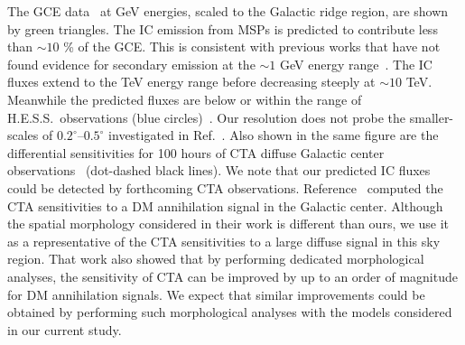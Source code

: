 \documentclass[doublespace,nopageskip]{VTthesis} %
\begin{document}
The GCE data~\cite{2015MNRAS.451.1833M} at GeV energies, scaled to the Galactic ridge region, are shown by green triangles. The IC emission from MSPs is predicted to contribute less than $\sim 10$ \% of the GCE. This is consistent with previous works that have not found evidence for secondary emission at the $\sim 1$ GeV energy range~\cite{2016PhRvD..93j3004L}. The IC fluxes extend to the TeV energy range before decreasing steeply at $\sim 10$ TeV. Meanwhile the predicted fluxes are below or within the range of H.E.S.S.~observations (blue circles)~\cite{2006Natur.439..695A}. Our resolution does not probe the smaller-scales of $0.2^\circ$--$0.5^\circ$ investigated in Ref.~\cite{2018PhRvD..98d3005H}. Also shown in the same figure are the differential sensitivities for 100 hours of CTA diffuse Galactic center observations~\cite{2015JCAP...03..055S} (dot-dashed black lines). We note that our predicted IC fluxes could be detected by forthcoming CTA observations. Reference~\cite{2015JCAP...03..055S} computed the CTA sensitivities to a DM annihilation signal in the Galactic center. Although the spatial morphology considered in their work is different than ours, we use it as a representative of the CTA sensitivities to a large diffuse signal in this sky region. That work also showed that by performing dedicated morphological analyses, the sensitivity of CTA can be improved by up to an order of magnitude for DM annihilation signals. We expect that similar improvements could be obtained by performing such morphological analyses with the models considered in our current study.
\end{document}
